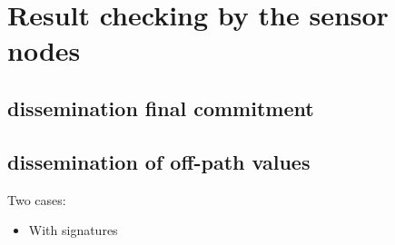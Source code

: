 
\section{Result checking by the sensor nodes}

	\subsection{dissemination final commitment}
	\subsection{dissemination of off-path values}
		Two cases:
		\begin{itemize}
			\item {With signatures}
		\end{itemize}

